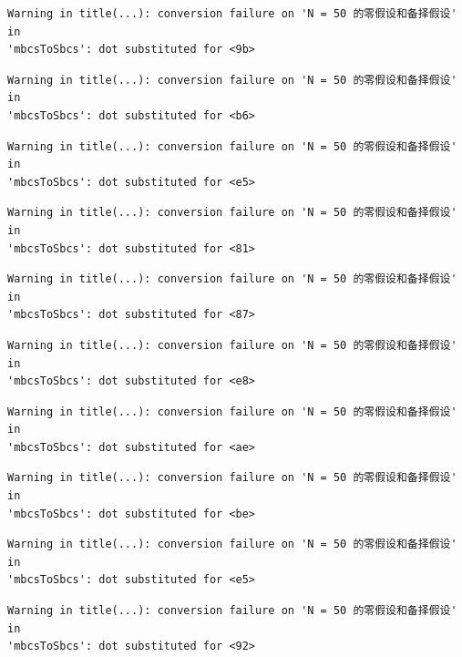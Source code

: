 \documentclass[
  letterpaper,
  DIV=11,
  numbers=noendperiod]{scrreprt}
\begin{document}
\begin{verbatim}
Warning in title(...): conversion failure on 'N = 50 的零假设和备择假设' in
'mbcsToSbcs': dot substituted for <9b>
\end{verbatim}

\begin{verbatim}
Warning in title(...): conversion failure on 'N = 50 的零假设和备择假设' in
'mbcsToSbcs': dot substituted for <b6>
\end{verbatim}

\begin{verbatim}
Warning in title(...): conversion failure on 'N = 50 的零假设和备择假设' in
'mbcsToSbcs': dot substituted for <e5>
\end{verbatim}

\begin{verbatim}
Warning in title(...): conversion failure on 'N = 50 的零假设和备择假设' in
'mbcsToSbcs': dot substituted for <81>
\end{verbatim}

\begin{verbatim}
Warning in title(...): conversion failure on 'N = 50 的零假设和备择假设' in
'mbcsToSbcs': dot substituted for <87>
\end{verbatim}

\begin{verbatim}
Warning in title(...): conversion failure on 'N = 50 的零假设和备择假设' in
'mbcsToSbcs': dot substituted for <e8>
\end{verbatim}

\begin{verbatim}
Warning in title(...): conversion failure on 'N = 50 的零假设和备择假设' in
'mbcsToSbcs': dot substituted for <ae>
\end{verbatim}

\begin{verbatim}
Warning in title(...): conversion failure on 'N = 50 的零假设和备择假设' in
'mbcsToSbcs': dot substituted for <be>
\end{verbatim}

\begin{verbatim}
Warning in title(...): conversion failure on 'N = 50 的零假设和备择假设' in
'mbcsToSbcs': dot substituted for <e5>
\end{verbatim}

\begin{verbatim}
Warning in title(...): conversion failure on 'N = 50 的零假设和备择假设' in
'mbcsToSbcs': dot substituted for <92>
\end{verbatim}
\end{document}
